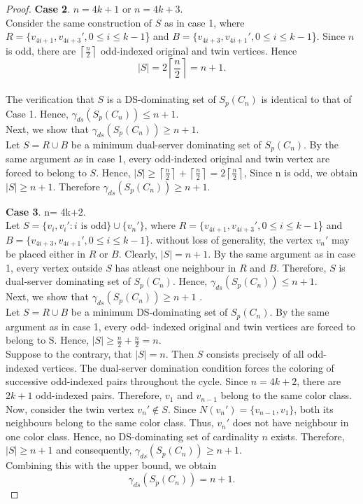 \documentclass{article}
\begin{document}
\begin{proof}
\textbf{Case 2}. $n= 4k+1$ or $n= 4k+3$.\\ Consider the same construction of $S$ as in case 1, where $R= \{v_{4i+1}, v_{4i+3}', 0 \le i \le k-1$\} and $B= \{v_{4i+3}, v_{4i+1}', 0 \le i \le k-1$\}. Since $n$ is odd, there are $\left\lceil \frac{n}{2} \right\rceil$ odd-indexed original and twin vertices. Hence \\\[ |S|= 2\left\lceil \frac{n}{2} \right\rceil= n+1. \]\\The verification that $S$ is a DS-dominating set of $S_p(C_n)$ is identical to that of Case 1. Hence, $\gamma_{ds}(S_p(C_n)) \leq n+1$. \\ Next, we show that $\gamma_{ds}(S_p(C_n)) \geq n+1$. 
\\Let $S= R \cup B$ be a minimum dual-server dominating set of $S_p(C_n)$. By the same argument as in case 1, every odd-indexed original and twin vertex are forced to belong to $S$. Hence, $|S| \geq \left\lceil \frac{n}{2} \right\rceil+\left\lceil \frac{n}{2} \right\rceil= 2\left\lceil \frac{n}{2} \right\rceil$, Since n is odd, we obtain $|S| \geq n+1$. Therefore $\gamma_{ds}(S_p(C_n)) \geq n+1$. 

\textbf{Case 3}. n= 4k+2.\\
Let $S= \{v_i, v_i': i \text{~is odd}\} \cup \{v_n'\}$, where $R= \{v_{4i+1}, v_{4i+3}', 0 \le i \le k-1$\} and $B= \{v_{4i+3}, v_{4i+1}', 0 \le i \le k-1$\}. without loss of generality, the vertex $v_n'$ may be placed either in $R$ or $B$. Clearly, $|S|= n+1$. By the same argument as in case 1, every vertex outside $S$ has atleast one neighbour in $R$ and $B$. Therefore, $S$ is dual-server dominating set of $S_p(C_n)$. Hence, $\gamma_{ds}(S_p(C_n)) \leq n+1$.\\

Next, we show that $\gamma_{ds}(S_p(C_n)) \geq n+1$ .\\ Let $S= R \cup B $ be a minimum DS-dominating set of $S_p(C_n)$. By the same argument as in case 1, every odd- indexed original and twin vertices are forced to belong to S. Hence, $|S| \geq  \frac{n}{2} + \frac{n}{2} =n$.\\Suppose to the contrary, that $|S|= n$. Then $S$ consists precisely of all odd-indexed vertices. The dual-server domination condition forces the coloring of successive odd-indexed pairs throughout the cycle. Since $n= 4k+2$, there are $2k+1$ odd-indexed pairs. Therefore, $v_1$ and $v_{n-1}$ belong to the same color class. Now, consider the twin vertex $v_n' \notin S$. Since $N(v_n')= \{v_{n-1}, v_1\}$, both its neighbours belong to the same color class. Thus, $v_n'$ does not have neighbour in one color class. Hence, no DS-dominating set of cardinality $n$ exists. Therefore, $|S| \geq n+1$ and consequently, $\gamma_{ds}(S_p(C_n)) \geq n+1$.\\ Combining this with the upper bound, we obtain  \[ \gamma_{ds}(S_p(C_n))=  n+1.\]
\end{proof}
\end{document}
